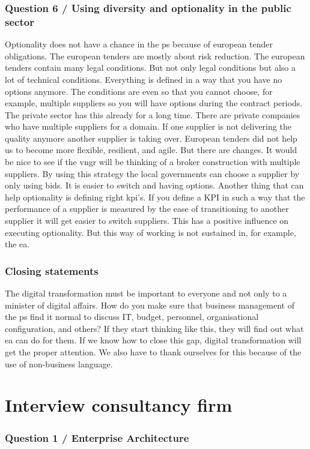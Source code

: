 \subsubsection{Question 6 / Using diversity and optionality in the public sector}
Optionality does not have a chance in the \gls{ps} because of european tender obligations. The european tenders are mostly about risk reduction. The european tenders contain many legal conditions. But not only legal conditions but also a lot of technical conditions. Everything is defined in a way that you have no options anymore. The conditions are even so that you cannot choose, for example, multiple suppliers so you will have options during the contract periods. The private sector has this already for a long time. There are private companies who have multiple suppliers for a domain. If one supplier is not delivering the quality anymore another supplier is taking over. European tenders did not help us to become more flexible, resilient, and agile. But there are changes. It would be nice to see if the \acrfull{vngr} will be thinking of a broker construction with multiple suppliers. By using this strategy the local governments can choose a supplier by only using bids. It is easier to switch and having options. Another thing that can help optionality is defining right \acrfull{kpi}'s. If you define a KPI in such a way that the performance of a supplier is measured by the ease of transitioning to another supplier it will get easier to switch suppliers. This has a positive influence on executing optionality. But this way of working is not sustained in, for example, the \acrshort{ea}.
\subsubsection{Closing statements}
The digital transformation must be important to everyone and not only to a minister of digital affairs. How do you make sure that business management of the \gls{ps} find it normal to discuss IT, budget, personnel, organisational configuration, and others? If they start thinking like this, they will find out what \acrshort{ea} can do for them. If we know how to close this gap, digital transformation will get the proper attention. We also have to thank ourselves for this because of the use of non-business language.
\section{Interview consultancy firm}
\label{sec:interviewconsultancyfirm}
\subsubsection{Question 1 / Enterprise Architecture}

